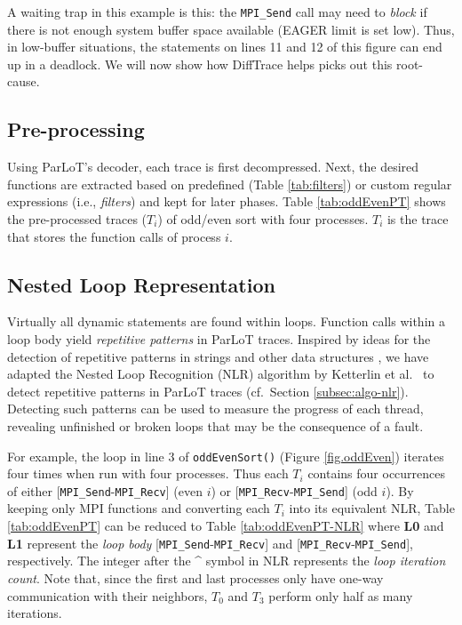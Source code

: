 A waiting trap in this example is this:
the \texttt{MPI\_Send} call may need to \textit{block} if there is not enough system buffer space available (EAGER limit is set low).
%
Thus, in low-buffer situations, the statements on lines 11 and 12 of
this figure can end up in a deadlock.
%
We will now show how DiffTrace helps picks out this root-cause.

\subsection{Pre-processing}

Using ParLoT's decoder, each trace is first decompressed.
Next, the desired functions are extracted based on predefined
(Table \ref{tab:filters}) or custom regular expressions
(i.e., \textit{filters}) and kept for later phases.
%
Table \ref{tab:oddEvenPT} shows the pre-processed traces ($T_i$) of odd/even sort with four processes.
$T_i$ is the trace that stores the function calls of process $i$.


\subsection{Nested Loop Representation}



Virtually all dynamic statements are found within loops.
%
Function calls within a loop body yield \textit{repetitive patterns}
in ParLoT traces.
%
Inspired by ideas for the detection of repetitive patterns in strings \cite{nakamura_fast_2013}
and other data structures \cite{kmr},
we have adapted the Nested Loop Recognition (NLR) algorithm by Ketterlin et al.~\cite{Ketterlin-nlr}
to detect repetitive patterns in ParLoT traces (cf.~Section \ref{subsec:algo-nlr}).
Detecting such patterns can be used to measure the progress of each thread,
revealing unfinished or broken loops that may be the consequence of a fault.

For example, the loop in line 3 of \texttt{oddEvenSort()} (Figure \ref{fig.oddEven}) iterates
four times when run with four processes.
Thus each $T_i$ contains four occurrences of either [\texttt{MPI\_Send}-\texttt{MPI\_Recv}] (even $i$)
or [\texttt{MPI\_Recv}-\texttt{MPI\_Send}] (odd $i$).
By keeping only MPI functions and converting each $T_i$ into its equivalent NLR,
Table \ref{tab:oddEvenPT} can be reduced to Table \ref{tab:oddEvenPT-NLR} where \textbf{L0} and \textbf{L1}
represent the \textit{loop body} [\texttt{MPI\_Send}-\texttt{MPI\_Recv}] and
[\texttt{MPI\_Recv}-\texttt{MPI\_Send}], respectively.
The integer after the \^{} symbol in NLR represents the \textit{loop iteration count}.
Note that, since the first and last processes only have one-way communication with their neighbors,
$T_0$ and $T_3$ perform only half as many iterations.


